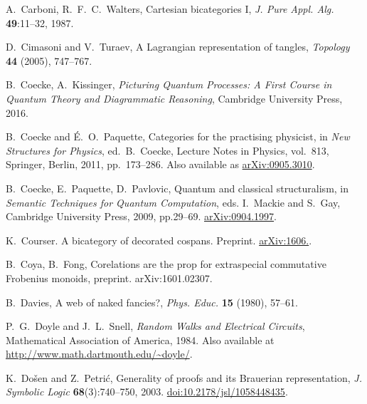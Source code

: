 \begin{thebibliography}{RSW00}
      A.\ Carboni, R.\ F.\ C.\ Walters, Cartesian bicategories I,
    \textsl{J. Pure Appl. Alg.} {\bf 49}:11--32, 1987. 

     D.\ Cimasoni and V.\ Turaev, A Lagrangian representation of
    tangles, {\sl Topology} {\bf 44} (2005), 747--767.

     B.\ Coecke, A.\ Kissinger, \textsl{Picturing Quantum
    Processes: A First Course in Quantum Theory and Diagrammatic Reasoning},
    Cambridge University Press, 2016.

     B.\ Coecke and \'E.\ O.\ Paquette, Categories for the practising
    physicist, in {\sl New Structures for Physics}, ed.\ B.\ Coecke,  
    Lecture Notes in Physics, vol.\ 813, Springer, Berlin, 2011, pp.\ 173--286.
    Also available as \href{http://arxiv.org/abs/0905.3010}{arXiv:0905.3010}.

     B.\ Coecke, E.\ Paquette, D.\ Pavlovic, Quantum and
    classical structuralism, in \textsl{Semantic Techniques for Quantum
    Computation}, eds. I.\ Mackie and S.\ Gay, Cambridge University Press, 2009,
    pp.29--69. \href{http://arxiv.org/abs/0904.1997}{arXiv:0904.1997}.

    K.\ Courser.
    \newblock A bicategory of decorated cospans.
    \newblock Preprint. 
    \newblock \href{http://arxiv.org/abs/1606.}{arXiv:1606.}.

     B.\ Coya, B.\ Fong, Corelations are the prop for
    extraspecial commutative Frobenius monoids, preprint. arXiv:1601.02307.


     B.\ Davies, A web of naked fancies?, {\sl Phys. Educ.} {\bf 15}
    (1980), 57--61.

     P.\ G.\ Doyle and J.\ L.\ Snell, {\sl Random Walks and
    Electrical Circuits}, Mathematical Association of America, 1984. Also
    available at
    \href{http://www.math.dartmouth.edu/~doyle/}
    {http://www.math.dartmouth.edu/\~{}doyle/}.

     K.\ Do\v{s}en and Z.\ Petri\'c, Generality of proofs and its Brauerian representation,
    \textsl{J. Symbolic Logic} {\bf 68}(3):740--750, 2003.
    \href{http://doi.org/10.2178/jsl/1058448435}{doi:10.2178/jsl/1058448435}.




\end{thebibliography}
